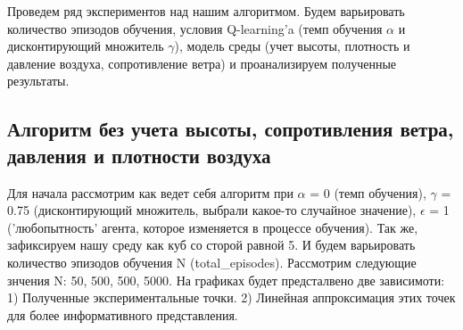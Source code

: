 \documentclass[a4paper]{report}
\theoremstyle{definition}
\theoremstyle{plain}
\theoremstyle{remark}
\theoremstyle{remark}
\theoremstyle{definition}
\begin{document}
Проведем ряд экспериментов над нашим алгоритмом. Будем варьировать количество эпизодов обучения, условия Q-learning'a (темп обучения $\alpha$ и дисконтирующий множитель $\gamma$), модель среды (учет высоты, плотность и давление воздуха, сопротивление ветра) и проанализируем полученные результаты.
\\
\begin{center}
    \subsection{Алгоритм без учета высоты, сопротивления ветра, давления и плотности воздуха}
\end{center}

Для начала рассмотрим как ведет себя алгоритм при $\alpha$ = 0 (темп обучения), $\gamma$ = 0.75 (дисконтирующий множитель, выбрали какое-то случайное значение), $\epsilon$ = 1 ('любопытность'  агента, которое изменяется в процессе обучения). Так же, зафиксируем нашу среду как куб со сторой равной 5. И будем варьировать количество эпизодов обучения N (total\_episodes). Рассмотрим следующие знчения N: 50, 500, 500, 5000. На графиках будет предсталвено две зависимоти: 1) Полученные экспериментальные точки. 2) Линейная аппроксимация этих точек для более информативного представления. 
\end{document}
